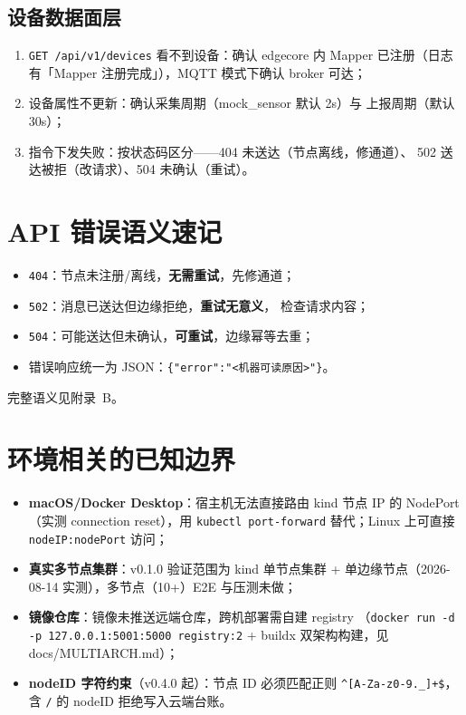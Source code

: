 \subsection{设备数据面层}

\begin{enumerate}
  \item \texttt{GET /api/v1/devices} 看不到设备：确认 edgecore 内
        Mapper 已注册（日志有「Mapper 注册完成」），MQTT 模式下确认
        broker 可达；
  \item 设备属性不更新：确认采集周期（mock\_sensor 默认 2s）与
        上报周期（默认 30s）；
  \item 指令下发失败：按状态码区分——404 未送达（节点离线，修通道）、
        502 送达被拒（改请求）、504 未确认（重试）。
\end{enumerate}

\section{API 错误语义速记}

\begin{itemize}
  \item \texttt{404}：节点未注册/离线，\textbf{无需重试}，先修通道；
  \item \texttt{502}：消息已送达但边缘拒绝，\textbf{重试无意义}，
        检查请求内容；
  \item \texttt{504}：可能送达但未确认，\textbf{可重试}，边缘幂等去重；
  \item 错误响应统一为 JSON：\texttt{\{"error":"<机器可读原因>"\}}。
\end{itemize}

完整语义见附录~B。

\section{环境相关的已知边界}

\begin{itemize}
  \item \textbf{macOS/Docker Desktop}：宿主机无法直接路由 kind 节点 IP
        的 NodePort（实测 connection reset），用
        \texttt{kubectl port-forward} 替代；Linux 上可直接
        \texttt{nodeIP:nodePort} 访问；
  \item \textbf{真实多节点集群}：v0.1.0 验证范围为 kind 单节点集群 +
        单边缘节点（2026-08-14 实测），多节点（10+）E2E 与压测未做；
  \item \textbf{镜像仓库}：镜像未推送远端仓库，跨机部署需自建 registry
        （\texttt{docker run -d -p 127.0.0.1:5001:5000 registry:2} +
        buildx 双架构构建，见 docs/MULTIARCH.md）；
  \item \textbf{nodeID 字符约束}（v0.4.0 起）：节点 ID 必须匹配正则
        \texttt{\textasciicircum{}[A-Za-z0-9.\_\-]+\$}，含 \texttt{/} 的
        nodeID 拒绝写入云端台账。
\end{itemize}
